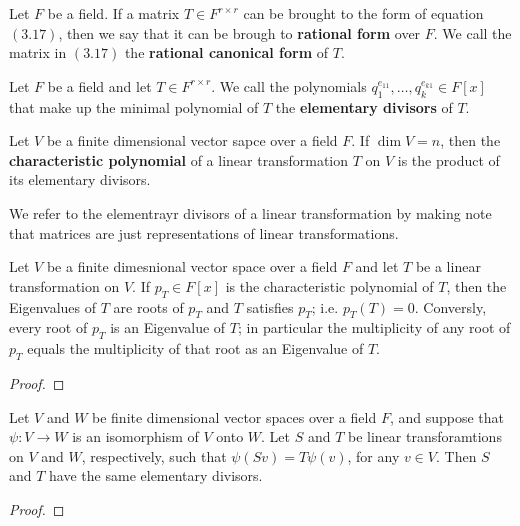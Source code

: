 \begin{definition}
    Let $F$ be a field. If a matrix  $T \in F^{r \times r}$ can be brought to
    the form of equation  $(3.17)$, then we say that it can be brough to
    \textbf{rational form} over $F$. We call the matrix in  $(3.17)$ the
    \textbf{rational canonical form} of $T$.
\end{definition}

\begin{definition}
    Let $F$ be a field and let  $T \in F^{r \times r}$. We call the polynomials
    $q_1^{e_{11}}, \dots, q_k^{e_{k1}} \in F[x]$ that make up the minimal
    polynomial of $T$ the  \textbf{elementary divisors} of $T$.
\end{definition}

\begin{definition}
    Let $V$ be a finite dimensional vector sapce over a field  $F$. If
    $\dim{V}=n$, then the \textbf{characteristic polynomial} of a linear
    transformation $T$ on  $V$ is the product of its elementary divisors.
\end{definition}
\begin{remark}
    We refer to the elementrayr divisors of a linear transformation by making
    note that matrices are just representations of linear transformations.
\end{remark}

\begin{lemma}\label{3.4.24}
    Let $V$ be a finite dimesnional vector space over a field $F$ and let  $T$
    be a linear transformation on  $V$. If $p_T \in F[x]$ is the characteristic
    polynomial of $T$, then the Eigenvalues of $T$ are roots of  $p_T$ and  $T$
    satisfies  $p_T$; i.e.  $p_T(T)=0$. Conversly, every root of $p_T$ is an
    Eigenvalue of  $T$; in particular the multiplicity of any root of  $p_T$
    equals the multiplicity of that root as an Eigenvalue of $T$.
\end{lemma}
\begin{proof}
\end{proof}

\begin{theorem}\label{3.4.25}
    Let $V$ and  $W$ be finite dimensional vector spaces over a field  $F$, and
    suppose that  $\psi:V \rightarrow W$ is an isomorphism of $V$ onto  $W$.
    Let  $S$ and  $T$ be linear transforamtions on  $V$ and  $W$, respectively,
    such that  $\psi(Sv)=T\psi(v)$, for any $v \in V$. Then  $S$ and  $T$ have
    the same elementary divisors.
\end{theorem}
\begin{proof}
\end{proof}

